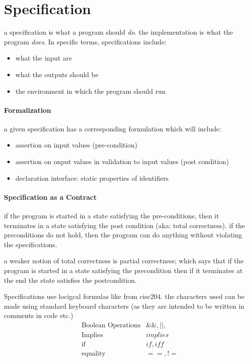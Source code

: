 \documentclass[12pt]{book}
\title{\coursetitle\linebreak\lecturename}
\author{\\Cain Susko\\ 
           \\ \\ \\
      Queen's University 
    \\School of Computing\\}
\begin{document}
\begin{titlepage}
        \maketitle
\end{titlepage}


\section*{Specification}
a specification is what a program should \textit{do}. the implementation is what the program \textit{does}.
In specific terms, specifications include:
\begin{itemize}
        \item what the input are
        \item what the outputs should be
        \item the environment in which the program should run
\end{itemize}

\paragraph{Formalization}
a given specification has a corresponding formulation which will include:
\begin{itemize}
        \item assertion on input values (pre-condition)
        \item assertion on onput values in validation to input values (post condition)
        \item declaration interface: static properties of identifiers
\end{itemize}

\paragraph{Specification as a Contract}
if the program is started in a state satisfying the pre-conditions, then it terminates in a state satisfying the post condition (aka: total correctness).
if the preconditions do not hold, then the program can do anything without violating the specifications.

a weaker notion of total correctness is partial correctness; which says that if the program is started in a state satisfying the precondition then 
if it terminates at the end the state satisfies the postcondition.

Specifications use locigcal formulas like from cisc204. the characters used can be made using standard keyboard
characters (as they are intended to be written in comments in code etc.)
\begin{align*}
        &\text{Boolean Operations} &\&\&, ||, \!\\
        & \text{Implies} &implies\\
        &\text{if} &if, iff\\
        & \text{equality} &==, !=
\end{align*}
\end{document}
